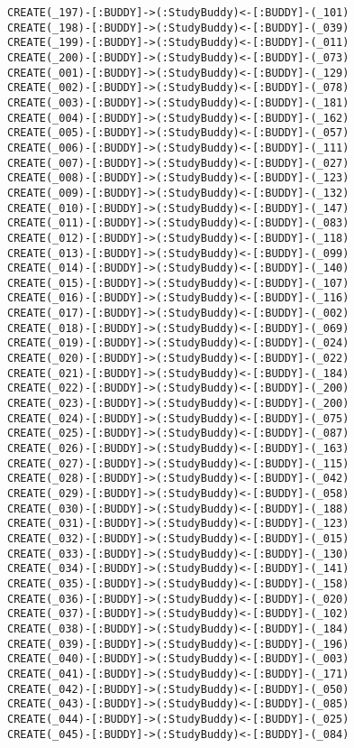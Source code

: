 \begin{lstlisting}
CREATE(_197)-[:BUDDY]->(:StudyBuddy)<-[:BUDDY]-(_101)
CREATE(_198)-[:BUDDY]->(:StudyBuddy)<-[:BUDDY]-(_039)
CREATE(_199)-[:BUDDY]->(:StudyBuddy)<-[:BUDDY]-(_011)
CREATE(_200)-[:BUDDY]->(:StudyBuddy)<-[:BUDDY]-(_073)
CREATE(_001)-[:BUDDY]->(:StudyBuddy)<-[:BUDDY]-(_129)
CREATE(_002)-[:BUDDY]->(:StudyBuddy)<-[:BUDDY]-(_078)
CREATE(_003)-[:BUDDY]->(:StudyBuddy)<-[:BUDDY]-(_181)
CREATE(_004)-[:BUDDY]->(:StudyBuddy)<-[:BUDDY]-(_162)
CREATE(_005)-[:BUDDY]->(:StudyBuddy)<-[:BUDDY]-(_057)
CREATE(_006)-[:BUDDY]->(:StudyBuddy)<-[:BUDDY]-(_111)
CREATE(_007)-[:BUDDY]->(:StudyBuddy)<-[:BUDDY]-(_027)
CREATE(_008)-[:BUDDY]->(:StudyBuddy)<-[:BUDDY]-(_123)
CREATE(_009)-[:BUDDY]->(:StudyBuddy)<-[:BUDDY]-(_132)
CREATE(_010)-[:BUDDY]->(:StudyBuddy)<-[:BUDDY]-(_147)
CREATE(_011)-[:BUDDY]->(:StudyBuddy)<-[:BUDDY]-(_083)
CREATE(_012)-[:BUDDY]->(:StudyBuddy)<-[:BUDDY]-(_118)
CREATE(_013)-[:BUDDY]->(:StudyBuddy)<-[:BUDDY]-(_099)
CREATE(_014)-[:BUDDY]->(:StudyBuddy)<-[:BUDDY]-(_140)
CREATE(_015)-[:BUDDY]->(:StudyBuddy)<-[:BUDDY]-(_107)
CREATE(_016)-[:BUDDY]->(:StudyBuddy)<-[:BUDDY]-(_116)
CREATE(_017)-[:BUDDY]->(:StudyBuddy)<-[:BUDDY]-(_002)
CREATE(_018)-[:BUDDY]->(:StudyBuddy)<-[:BUDDY]-(_069)
CREATE(_019)-[:BUDDY]->(:StudyBuddy)<-[:BUDDY]-(_024)
CREATE(_020)-[:BUDDY]->(:StudyBuddy)<-[:BUDDY]-(_022)
CREATE(_021)-[:BUDDY]->(:StudyBuddy)<-[:BUDDY]-(_184)
CREATE(_022)-[:BUDDY]->(:StudyBuddy)<-[:BUDDY]-(_200)
CREATE(_023)-[:BUDDY]->(:StudyBuddy)<-[:BUDDY]-(_200)
CREATE(_024)-[:BUDDY]->(:StudyBuddy)<-[:BUDDY]-(_075)
CREATE(_025)-[:BUDDY]->(:StudyBuddy)<-[:BUDDY]-(_087)
CREATE(_026)-[:BUDDY]->(:StudyBuddy)<-[:BUDDY]-(_163)
CREATE(_027)-[:BUDDY]->(:StudyBuddy)<-[:BUDDY]-(_115)
CREATE(_028)-[:BUDDY]->(:StudyBuddy)<-[:BUDDY]-(_042)
CREATE(_029)-[:BUDDY]->(:StudyBuddy)<-[:BUDDY]-(_058)
CREATE(_030)-[:BUDDY]->(:StudyBuddy)<-[:BUDDY]-(_188)
CREATE(_031)-[:BUDDY]->(:StudyBuddy)<-[:BUDDY]-(_123)
CREATE(_032)-[:BUDDY]->(:StudyBuddy)<-[:BUDDY]-(_015)
CREATE(_033)-[:BUDDY]->(:StudyBuddy)<-[:BUDDY]-(_130)
CREATE(_034)-[:BUDDY]->(:StudyBuddy)<-[:BUDDY]-(_141)
CREATE(_035)-[:BUDDY]->(:StudyBuddy)<-[:BUDDY]-(_158)
CREATE(_036)-[:BUDDY]->(:StudyBuddy)<-[:BUDDY]-(_020)
CREATE(_037)-[:BUDDY]->(:StudyBuddy)<-[:BUDDY]-(_102)
CREATE(_038)-[:BUDDY]->(:StudyBuddy)<-[:BUDDY]-(_184)
CREATE(_039)-[:BUDDY]->(:StudyBuddy)<-[:BUDDY]-(_196)
CREATE(_040)-[:BUDDY]->(:StudyBuddy)<-[:BUDDY]-(_003)
CREATE(_041)-[:BUDDY]->(:StudyBuddy)<-[:BUDDY]-(_171)
CREATE(_042)-[:BUDDY]->(:StudyBuddy)<-[:BUDDY]-(_050)
CREATE(_043)-[:BUDDY]->(:StudyBuddy)<-[:BUDDY]-(_085)
CREATE(_044)-[:BUDDY]->(:StudyBuddy)<-[:BUDDY]-(_025)
CREATE(_045)-[:BUDDY]->(:StudyBuddy)<-[:BUDDY]-(_084)

\end{lstlisting}
